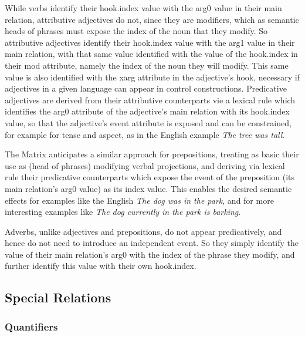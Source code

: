 \documentclass[12pt]{article}
\begin{document}
While verbs identify their {\sc hook.index} value with the {\sc arg0} value in
their main relation, attributive adjectives do not, since they are modifiers, 
which as semantic heads of phrases must expose the index of the noun
that they modify.  So attributive adjectives identify their {\sc hook.index}
value with the {\sc arg1} value in their main relation, with that same value
identified with the value of the {\sc hook.index} in their {\sc mod} attribute,
namely the index of the noun they will modify.  This same value is also
identified with the {\sc xarg} attribute in the adjective's {\sc hook},
necessary if adjectives in a given language can appear in control
constructions.  Predicative adjectives are derived from their attributive
counterparts vie a lexical rule which identifies the {\sc arg0} attribute
of the adjective's main relation with its {\sc hook.index} value, so that the
adjective's event attribute is exposed and can be constrained, for example for
tense and aspect, as in the English example {\it The tree was tall}.

The Matrix anticipates a similar approach for prepositions, treating as basic their
use as (head of phrases) modifying verbal projections, and deriving via lexical
rule their predicative counterparts which expose the event of the preposition
(its main relation's {\sc arg0} value) as its {\sc index} value.  This enables
the desired semantic effects for examples like the English {\it The dog was
in the park}, and for more interesting examples like {\it The dog currently
in the park is barking}.

Adverbs, unlike adjectives and prepositions, do not appear predicatively, and
hence do not need to introduce an independent event.  So they simply identify
the value of their main relation's {\sc arg0} with the index of the phrase
they modify, and further identify this value with their own {\sc hook.index}.

\subsection{Special Relations}


\subsubsection{Quantifiers}
\label{quantsec}
\end{document}
